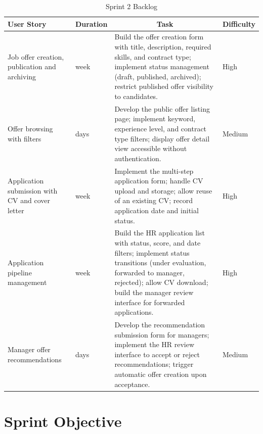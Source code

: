 \setlength{\tabcolsep}{4pt}
\renewcommand{\arraystretch}{1}
\begin{table}[H]
\centering
\small
\begin{tabularx}{\textwidth}{|>{\centering\arraybackslash}p{3.2cm}|>{\centering\arraybackslash}p{1.6cm}|X|>{\centering\arraybackslash}p{1.8cm}|}
\hline
\rowcolor{headerblue}
\textbf{User Story} & \textbf{Duration} & \multicolumn{1}{c|}{\textbf{Task}} & \textbf{Difficulty} \\
\hline
Job offer creation, publication and archiving
  & 1 week
  & Build the offer creation form with title, description, required skills, and contract type; implement status management (draft, published, archived); restrict published offer visibility to candidates.
  & High \\
\hline
Offer browsing with filters
  & 4 days
  & Develop the public offer listing page; implement keyword, experience level, and contract type filters; display offer detail view accessible without authentication.
  & Medium \\
\hline
Application submission with CV and cover letter
  & 1 week
  & Implement the multi-step application form; handle CV upload and storage; allow reuse of an existing CV; record application date and initial status.
  & High \\
\hline
Application pipeline management
  & 1 week
  & Build the HR application list with status, score, and date filters; implement status transitions (under evaluation, forwarded to manager, rejected); allow CV download; build the manager review interface for forwarded applications.
  & High \\
\hline
Manager offer recommendations
  & 3 days
  & Develop the recommendation submission form for managers; implement the HR review interface to accept or reject recommendations; trigger automatic offer creation upon acceptance.
  & Medium \\
\hline
\end{tabularx}
\caption{Sprint 2 Backlog}
\label{tab:sprint2backlog}
\end{table}
\normalsize
\setlength{\tabcolsep}{6pt}
\renewcommand{\arraystretch}{1}

\section{Sprint Objective}

